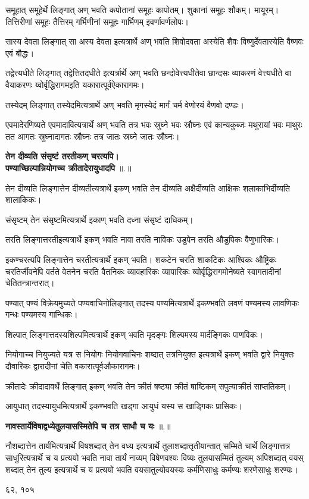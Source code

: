 \documentclass[14pt]{extarticle}   %
\newcounter{sutracount}[subsection]
\newcommand{\sutra}[1]{%
  \stepcounter{sutracount}%
  \textbf{#1} ॥\thesutracount॥%
}
\renewcommand{\thesutracount}{\thesubsection.\arabic{sutracount}}
\begin{document}
समूहात् समूहेर्थे लिङ्गात् अण् भवति कपोतानां समूहः कापोतम्। शुकानां समूहः शौकम्। मायूरम्। तित्तिरीणां समूहः तैत्तिरम् गर्भिणीनां समूहः गार्भिणम् इवर्णावर्णलोपः।

सास्य देवता लिङ्गात् सा अस्य देवता इत्यत्रार्थे अण् भवति शिवोदवता अस्येति शैवः विष्णुर्देवतास्येति वैष्णवः एवं बौद्धः। 

तद्वेत्त्यधीते लिङ्गात् तद्वेत्तितदधीते इत्यर्त्रार्थे अण् भवति छन्दोवेत्त्यधीतेवा छान्दसः व्याकरणं वेत्त्यधीते वा वैयाकरणः य्वोर्वृद्धिरागमइति यकारात्पूर्वऐकारागमः।

तस्येदम् लिङ्गात् तस्येदमित्यत्रार्थे अण् भवति मृगस्येदं मार्गं चर्म वेणोरयं वैणवो दण्डः।

एवमादेरणिष्यते एवमादावित्यत्रार्थे अण् भवति तत्र भवः स्रुघ्ने भवः स्रौघ्नः एवं कान्यकुब्जः मथुरायां भवः माथुरः तत आगतः स्रुघ्नादागतः स्रौघ्नः तत्र जातः स्रघ्ने जातः स्रौघ्नः।

\sutra{तेन दीव्यति संसृष्टं तरतीकण् चरत्यपि।\\ पण्याच्छिल्पान्नियोगच्च क्रीतादेरायुधादपि}

तेन दीव्यति लिङ्गात्तेन दीव्यतीत्यत्रार्थे इकण् भवति तेन दीव्यति अक्षैर्दीव्यति आक्षिकः शलाकाभिर्दीव्यति शालाकिकः।

संसृष्टम् तेन संसृष्टमित्यत्रार्थे इकाण् भवति दध्ना संसृष्टं दाधिकम्।

तरति लिङ्गात्तरतीइत्यत्रार्थे इकण् भवति नावा तरति नाविकः उडुपेन तरति औडुपिकः वैणुभारिकः।

इकण्चरत्यपि लिङ्गात्तेन चरतीत्यत्रार्थे इकण् भवति। शकटेन चरति शाकटिकः आश्विकः औष्ट्रिकः चरतिर्जीवनेपि वर्तते वेतनेन चरति वैतनिकः व्यावहारिकः व्यापारिकः य्वोर्वृद्धिरागमोनेष्यते स्वागतादीनां चेतितन्त्रान्तरात्।

पण्यात् पण्यं विक्रेयमुच्यते पण्यवाचिनोलिङ्गात् तदस्य पण्यमित्यत्रार्थे इकण्भवति लवणं पण्यमस्य लावणिकः गन्धः पण्यमस्य गान्धिकः।

शिल्पात् लिङ्गात्तदस्यशिल्पमित्यत्रार्थे इकण् भवति मृदङ्गः शिल्पमस्य मार्दङ्गिकः पाणविकः।

नियोगाच्च नियुज्यते यत्र स नियोगः नियोगवाचिनः शब्दात् तत्रनियुक्त इत्यत्रार्थे इकण् भवति द्वारे नियुक्तः दौवारिकः द्वारादीनां चेति वकारात्पूर्वऔकारागमः।

क्रीतादेः क्रीदादावर्थे लिङ्गात् इकण् भवति तेन क्रीतं षष्ट्या क्रीतं षाष्टिकम् सपुत्याक्रीतं साप्ततिकम्।

आयुधात् तदस्यायुधमित्यत्रार्थे इकण्भवति खड्गा आयुधं यस्य स खाड्गिकः प्रासिकः।

\sutra{नावस्तार्येविषाद्वध्येतुलयासस्मितेपि च तत्र साधौ च यः}

नौशब्दात्तेन तार्यमित्यत्रार्थे विषशब्दात् तेन वध्य इत्यत्रार्थे तुलाशब्दात्तृतीयान्तात् सम्मिते चार्थे लिङ्गात्तत्र साधुरित्यत्रार्थे च य प्रत्ययो भवति नावा तार्यं नाव्यम् विषेणवश्यः विष्यः तुलयासम्मितं तुल्यम् अपिशब्दात् वयस् शब्दात् तेन तुल्य इत्यत्रार्थे च य प्रत्ययो भवति वयसातुल्योवयस्यः कर्मणिसाधुः कर्मण्यः शरणेसाधुः शरण्यः।

६२, १०५
\end{document}
